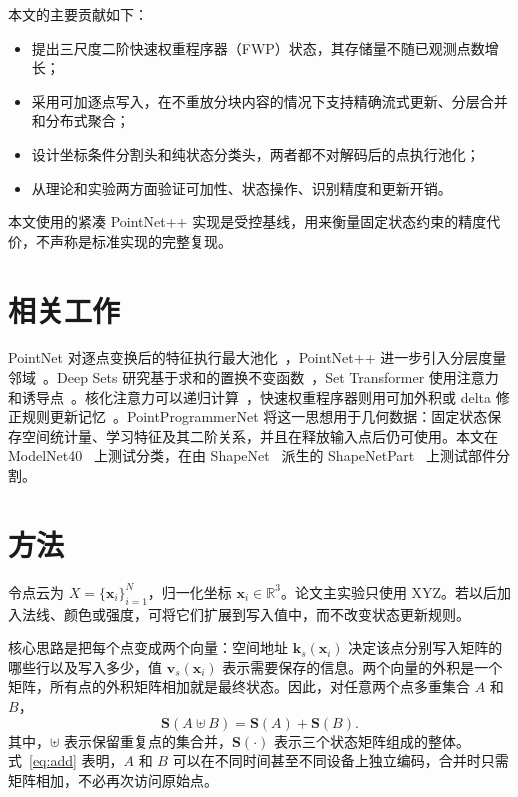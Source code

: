 \documentclass[UTF8,a4paper,11pt,fontset=windows]{ctexart}
\newcommand{\R}{\mathbb{R}}
\newcommand{\Sstate}{\mathbf{S}}
\begin{document}
本文的主要贡献如下：
\begin{itemize}
\item 提出三尺度二阶快速权重程序器（FWP）状态，其存储量不随已观测点数增长；
\item 采用可加逐点写入，在不重放分块内容的情况下支持精确流式更新、分层合并和分布式聚合；
\item 设计坐标条件分割头和纯状态分类头，两者都不对解码后的点执行池化；
\item 从理论和实验两方面验证可加性、状态操作、识别精度和更新开销。
\end{itemize}
本文使用的紧凑 PointNet++ 实现是受控基线，用来衡量固定状态约束的精度代价，不声称是标准实现的完整复现。

\section{相关工作}

PointNet 对逐点变换后的特征执行最大池化~\cite{qi2017pointnet}，PointNet++ 进一步引入分层度量邻域~\cite{qi2017pointnetplusplus}。Deep Sets 研究基于求和的置换不变函数~\cite{zaheer2017deepsets}，Set Transformer 使用注意力和诱导点~\cite{lee2019settransformer}。核化注意力可以递归计算~\cite{katharopoulos2020transformers}，快速权重程序器则用可加外积或 delta 修正规则更新记忆~\cite{schlag2021linear}。PointProgrammerNet 将这一思想用于几何数据：固定状态保存空间统计量、学习特征及其二阶关系，并且在释放输入点后仍可使用。本文在 ModelNet40~\cite{wu20153dshapenets} 上测试分类，在由 ShapeNet~\cite{chang2015shapenet} 派生的 ShapeNetPart~\cite{yi2016scalable} 上测试部件分割。

\section{方法}

令点云为 $X=\{\bm{x}_i\}_{i=1}^N$，归一化坐标 $\bm{x}_i\in\R^3$。论文主实验只使用 XYZ。若以后加入法线、颜色或强度，可将它们扩展到写入值中，而不改变状态更新规则。

核心思路是把每个点变成两个向量：空间地址 $\bm k_s(\bm x_i)$ 决定该点分别写入矩阵的哪些行以及写入多少，值 $\bm v_s(\bm x_i)$ 表示需要保存的信息。两个向量的外积是一个矩阵，所有点的外积矩阵相加就是最终状态。因此，对任意两个点多重集合 $A$ 和 $B$，
\begin{equation}
\Sstate(A\uplus B)=\Sstate(A)+\Sstate(B).
\label{eq:add}
\end{equation}
其中，$\uplus$ 表示保留重复点的集合并，$\Sstate(\cdot)$ 表示三个状态矩阵组成的整体。式~\eqref{eq:add} 表明，$A$ 和 $B$ 可以在不同时间甚至不同设备上独立编码，合并时只需矩阵相加，不必再次访问原始点。
\end{document}
